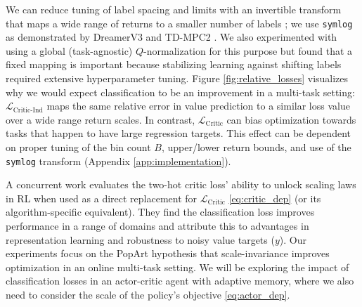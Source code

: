 We can reduce tuning of label spacing and limits with an invertible transform that maps a wide range of returns to a smaller number of labels \cite{kapturowski2018recurrent}; we use \texttt{symlog} as demonstrated by DreamerV3 \cite{hafner2023mastering} and TD-MPC2 \cite{hansen2023td}. We also experimented with using a global (task-agnostic) $Q$-normalization for this purpose but found that a fixed mapping is important because stabilizing learning against shifting labels required extensive hyperparameter tuning. Figure \ref{fig:relative_losses} visualizes why we would expect classification to be an improvement in a multi-task setting: $\mathcal{L}_{\text{Critic-Ind}}$ maps the same relative error in value prediction to a similar loss value over a wide range return scales. In contrast, $\mathcal{L}_{\text{Critic}}$ can bias optimization towards tasks that happen to have large regression targets. This effect can be dependent on proper tuning of the bin count $B$, upper/lower return bounds, and use of the \texttt{symlog} transform (Appendix \ref{app:implementation}).


A concurrent work \cite{farebrother2024stop} evaluates the two-hot critic loss' ability to unlock scaling laws in RL when used as a direct replacement for $\mathcal{L}_{\text{Critic}}$ \eqref{eq:critic_dep} (or its algorithm-specific equivalent). They find the classification loss improves performance in a range of domains and attribute this to advantages in representation learning and robustness to noisy value targets ($y$). Our experiments focus on the PopArt hypothesis that scale-invariance improves optimization in an online multi-task setting. We will be exploring the impact of classification losses in an actor-critic agent with adaptive memory, where we also need to consider the scale of the policy's objective \eqref{eq:actor_dep}.


